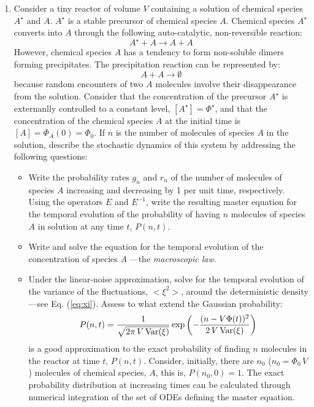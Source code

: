 \documentclass{article}
\begin{document}
\begin{enumerate}
\item Consider a tiny reactor of volume $V$ containing a solution of chemical species $A^{\star}$ and $A$. $A^{\star}$ is a stable precursor of chemical species $A$. Chemical species $A^{\star}$ converts into $A$ through the following auto-catalytic, non-reversible reaction:
\begin{equation}
A^{\star} + A \longrightarrow A + A
\end{equation}    
However, chemical species $A$ has a tendency to form non-soluble dimers forming precipitates. The precipitation reaction can be represented by:   
\begin{equation}
A + A \longrightarrow \emptyset
\end{equation}
because random encounters of two $A$ molecules involve their disappearance from the solution. Consider that the concentration of the precursor $A^{\star}$ is externanlly controlled to a constant level, $[A^{\star}] = \Phi^{\star}$, and that the concentration of the chemical species $A$ at the initial time is $[A]= \Phi_A(0) = \Phi_0$. If $n$ is the number of molecules of species $A$ in the solution, describe the stochastic dynamics of this system by addressing the following questions:
\begin{itemize}
\item Write the probability rates $g_n$ and $r_n$ of the number of molecules of species $A$ increasing and decreasing by 1 per unit time,  respectively. Using the operators $E$ and $E^{-1}$, write the resulting master equation for the temporal evolution of the probability of having $n$ molecules of species $A$ in solution at any time $t$, $P(n,t)$. 
\item Write and solve the equation for the temporal evolution of the concentration of species $A$ ---the {\em macroscopic law}.    
\item Under the linear-noise approximation, solve for the temporal evolution of the variance of the fluctuations,  $<\xi^2>$, around the deterministic density ---see Eq. (\ref{eq:xi}). Assess to what extend the Gaussian probability:
\begin{equation}
  P(n,t) = \frac{1}{\sqrt{2\pi\,V\,\textup{Var}(\xi)}}\exp\left(-\frac{(n-V\Phi(t))^2}{2\,V\,\textup{Var}(\xi)}\right)
\end{equation} 
is a good approximation to the exact probability of finding $n$ molecules in the reactor at time $t$, $P(n,t)$. Consider, initially, there are $n_0$ ($n_0 = \Phi_0\,V$) molecules of chemical species, $A$, this is, $P(n_0, 0) = 1$. The exact probability distribution at increasing times can be calculated through numerical integration of the set of ODEs defining the master equation. 
\end{itemize}
\end{enumerate}
\end{document}
